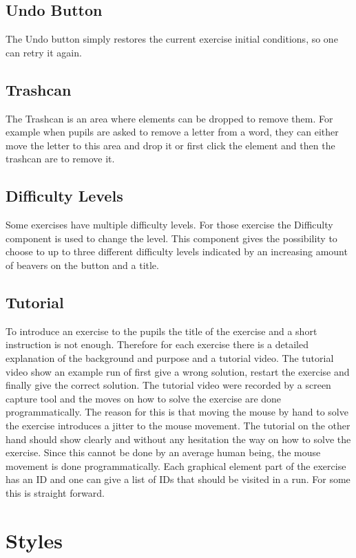 \subsection*{Undo Button}
The Undo button simply restores the current exercise initial conditions, so one can retry it again.

\subsection*{Trashcan}
The Trashcan is an area where elements can be dropped to remove them. For example when pupils are asked to remove a letter from a word, they can either move the letter to this area and drop it or first click the element and then the trashcan are to remove it.

\subsection*{Difficulty Levels}
Some exercises have multiple difficulty levels. For those exercise the Difficulty component is used to change the level. This component gives the possibility to choose to up to three different difficulty levels indicated by an increasing amount of beavers on the button and a title.

\subsection*{Tutorial}
To introduce an exercise to the pupils the title of the exercise and a short instruction is not enough. Therefore for each exercise there is a detailed explanation of the background and purpose and a tutorial video. The tutorial video show an example run of first give a wrong solution, restart the exercise and finally give the correct solution.
The tutorial video were recorded by a screen capture tool and the moves on how to solve the exercise are done programmatically. The reason for this is that moving the mouse by hand to solve the exercise introduces a jitter to the mouse movement. The tutorial on the other hand should show clearly and without any hesitation the way on how to solve the exercise. Since this cannot be done by an average human being, the mouse movement is done programmatically. Each graphical element part of the exercise has an ID and one can give a list of IDs that should be visited in a run. For some this is straight forward.

\section{Styles}
\label{section:styles}
